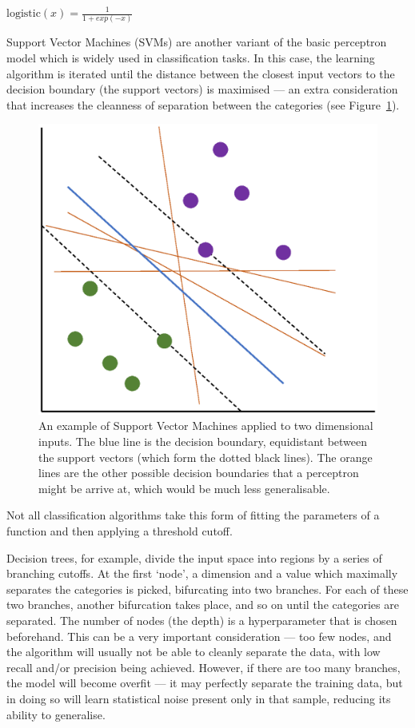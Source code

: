 $\text{logistic}(x)=\frac{1}{1+exp(-x)}$

Support Vector Machines (SVMs) are another variant of the basic perceptron model which is widely used in classification tasks. In this case, the learning algorithm is iterated until the distance between the closest input vectors to the decision boundary (the support vectors) is maximised --- an extra consideration that increases the cleanness of separation between the categories (see Figure~\ref{fig:SVM}).

\begin{figure}
\centering
\includegraphics[width=1.0\textwidth]{Figures/SVM.eps}
\caption[Support Vector Machines]{\label{fig:SVM} An example of Support Vector Machines applied to two dimensional inputs. The blue line is the decision boundary, equidistant between the support vectors (which form the dotted black lines). The orange lines are the other possible decision boundaries that a perceptron might be arrive at, which would be much less generalisable.}
\end{figure}

Not all classification algorithms take this form of fitting the parameters of a function and then applying a threshold cutoff.

Decision trees, for example, divide the input space into regions by a series of branching cutoffs. At the first `node', a dimension and a value which maximally separates the categories is picked, bifurcating into two branches. For each of these two branches, another bifurcation takes place, and so on until the categories are separated. The number of nodes (the depth) is a hyperparameter that is chosen beforehand. This can be a very important consideration --- too few nodes, and the algorithm will usually not be able to cleanly separate the data, with low recall and/or precision being achieved. However, if there are too many branches, the model will become overfit --- it may perfectly separate the training data, but in doing so will learn statistical noise present only in that sample, reducing its ability to generalise.

